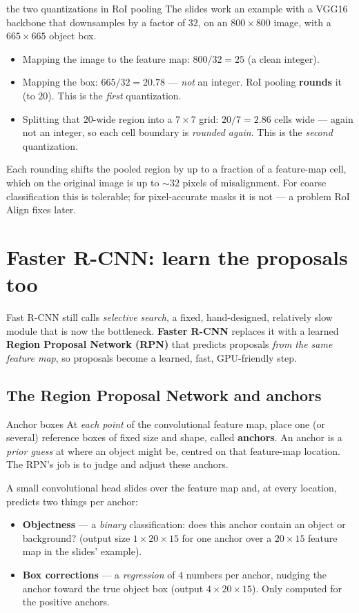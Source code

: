 \documentclass{report}
\begin{document}
\begin{exbox}{the two quantizations in RoI pooling}
The slides work an example with a VGG16 backbone that downsamples by a factor
of $32$, on an $800\times800$ image, with a $665\times665$ object box.
\begin{itemize}
\item Mapping the image to the feature map: $800/32 = 25$ (a clean integer).
\item Mapping the box: $665/32 = 20.78$ --- \emph{not} an integer. RoI pooling
\textbf{rounds} it (to $20$). This is the \emph{first} quantization.
\item Splitting that $20$-wide region into a $7\times7$ grid: $20/7 = 2.86$
cells wide --- again not an integer, so each cell boundary is \emph{rounded
again}. This is the \emph{second} quantization.
\end{itemize}
Each rounding shifts the pooled region by up to a fraction of a feature-map
cell, which on the original image is up to $\sim\!32$ pixels of misalignment.
For coarse classification this is tolerable; for pixel-accurate masks it is
not --- a problem RoI Align fixes later.
\end{exbox}

\section{Faster R-CNN: learn the proposals too}

Fast R-CNN still calls \emph{selective search}, a fixed, hand-designed,
relatively slow module that is now the bottleneck. \textbf{Faster R-CNN}
replaces it with a learned \textbf{Region Proposal Network (RPN)} that predicts
proposals \emph{from the same feature map}, so proposals become a learned,
fast, GPU-friendly step.

\subsection{The Region Proposal Network and anchors}

\begin{defbox}{Anchor boxes}
At \emph{each point} of the convolutional feature map, place one (or several)
reference boxes of fixed size and shape, called \textbf{anchors}. An anchor is
a \emph{prior guess} at where an object might be, centred on that feature-map
location. The RPN's job is to judge and adjust these anchors.
\end{defbox}

A small convolutional head slides over the feature map and, at every location,
predicts two things per anchor:
\begin{itemize}
\item \textbf{Objectness} --- a \emph{binary} classification: does this anchor
contain an object or background? (output size $1 \times 20 \times 15$ for one
anchor over a $20\times15$ feature map in the slides' example).
\item \textbf{Box corrections} --- a \emph{regression} of $4$ numbers per
anchor, nudging the anchor toward the true object box (output
$4 \times 20 \times 15$). Only computed for the positive anchors.
\end{itemize}
\end{document}

